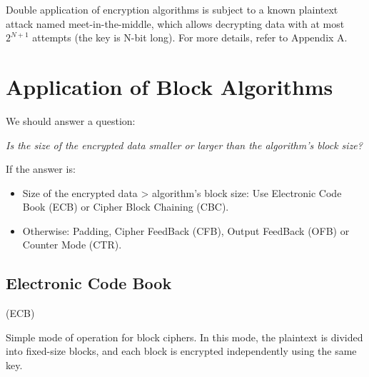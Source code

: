 \begin{tcolorbox}[colback=blue!10!white, colframe=blue!50!white, title=Meet-in-the-Middle attack]
    Double application of encryption algorithms is subject to a known plaintext attack named meet-in-the-middle, which allows decrypting data with at most $2^{N+1}$ attempts (the key is N-bit long).
    For more details, refer to Appendix A.
\end{tcolorbox}

\section{Application of Block Algorithms}
We should answer a question:
\begin{tcolorbox}[colframe=lightblue]
    \begin{center}
        \textit{Is the size of the encrypted data smaller or larger than \newline the algorithm’s block size?}
    \end{center}
\end{tcolorbox}
    

If the answer is:
\begin{itemize}
    \item Size of the encrypted data > algorithm's block size: Use Electronic Code Book (ECB) or Cipher Block Chaining (CBC).
    \item Otherwise: Padding, Cipher FeedBack (CFB), Output FeedBack (OFB) or Counter Mode (CTR).
\end{itemize}

\subsection{Electronic Code Book}
\begin{center}
    (ECB)
\end{center}

Simple mode of operation for block ciphers. In this mode, the plaintext is divided into fixed-size blocks, and each block is encrypted independently using the same key.

